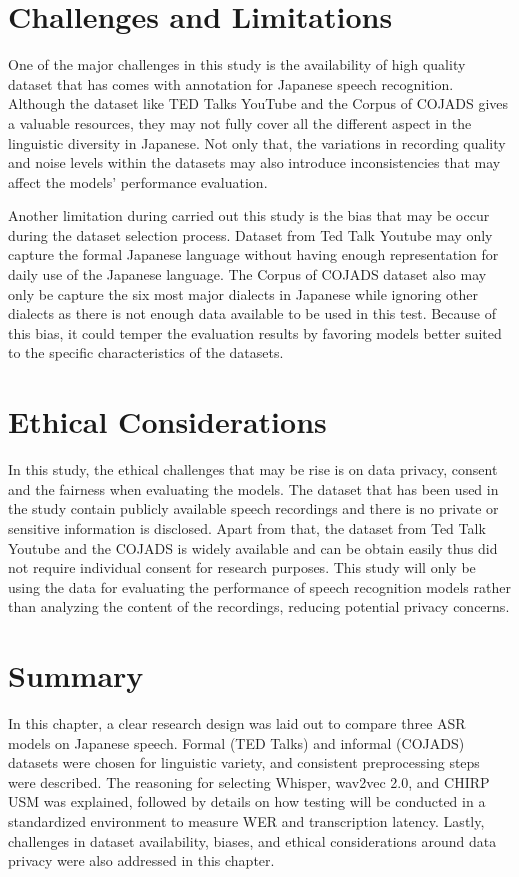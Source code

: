 \section{Challenges and Limitations}
One of the major challenges in this study is the availability of high quality dataset that has comes with annotation for Japanese speech recognition. Although the dataset like TED Talks YouTube and the Corpus of COJADS gives a valuable resources, they may not fully cover all the different aspect in the linguistic diversity in Japanese. Not only that, the variations in recording quality and noise levels within the datasets may also introduce inconsistencies that may affect the models’ performance evaluation.

Another limitation during carried out this study is the bias that may be occur during the dataset selection process. Dataset from Ted Talk Youtube may only capture the formal Japanese language without having enough representation for daily use of the Japanese language. The Corpus of COJADS dataset also may only be capture the six most major dialects in Japanese while ignoring other dialects as there is not enough data available to be used in this test. Because of this bias, it could temper the evaluation results by favoring models better suited to the specific characteristics of the datasets. 

\section{Ethical Considerations}  
In this study, the ethical challenges that may be rise is on data privacy, consent and the fairness when evaluating the models. The dataset that has been used in the study contain publicly available speech recordings and there is no private or sensitive information is disclosed. Apart from that, the dataset from Ted Talk Youtube and the COJADS is widely available and can be obtain easily thus did not require individual consent for research purposes. This study will only be using the data for evaluating the performance of speech recognition models rather than analyzing the content of the recordings, reducing potential privacy concerns.

\section{Summary}
In this chapter, a clear research design was laid out to compare three ASR models on Japanese speech. Formal (TED Talks) and informal (COJADS) datasets were chosen for linguistic variety, and consistent preprocessing steps were described. The reasoning for selecting Whisper, wav2vec 2.0, and CHIRP USM was explained, followed by details on how testing will be conducted in a standardized environment to measure WER and transcription latency. Lastly, challenges in dataset availability, biases, and ethical considerations around data privacy were also addressed in this chapter.